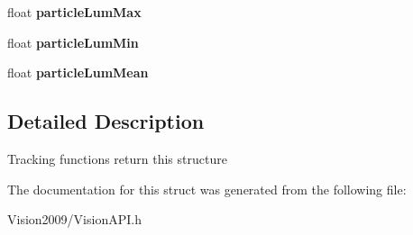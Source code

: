 \begin{DoxyCompactItemize}
\item 
\hypertarget{structColorReport__struct_ab09b3053cd59083725f3e572868aaf95}{
float {\bfseries particleLumMax}}
\label{structColorReport__struct_ab09b3053cd59083725f3e572868aaf95}

\item 
\hypertarget{structColorReport__struct_a53878785055e62616e914107a46559ac}{
float {\bfseries particleLumMin}}
\label{structColorReport__struct_a53878785055e62616e914107a46559ac}

\item 
\hypertarget{structColorReport__struct_a83dddadd68e27ca7ff1669f6eacf0db6}{
float {\bfseries particleLumMean}}
\label{structColorReport__struct_a83dddadd68e27ca7ff1669f6eacf0db6}

\end{DoxyCompactItemize}


\subsection{Detailed Description}
Tracking functions return this structure 

The documentation for this struct was generated from the following file:\begin{DoxyCompactItemize}
\item 
Vision2009/VisionAPI.h\end{DoxyCompactItemize}
